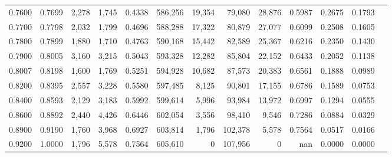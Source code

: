 \begin{tabular}{rrrrrrrrrrrrr}
0.7600 & 0.7699 &  2,278 & 1,745 &                                     0.4338 & 586,256 &  19,354 &  79,080 &  28,876 & 0.5987 & 0.2675 & 0.1793 \\
0.7700 & 0.7798 &  2,032 & 1,799 &                                     0.4696 & 588,288 &  17,322 &  80,879 &  27,077 & 0.6099 & 0.2508 & 0.1605 \\
0.7800 & 0.7899 &  1,880 & 1,710 &                                     0.4763 & 590,168 &  15,442 &  82,589 &  25,367 & 0.6216 & 0.2350 & 0.1430 \\
0.7900 & 0.8005 &  3,160 & 3,215 &                                     0.5043 & 593,328 &  12,282 &  85,804 &  22,152 & 0.6433 & 0.2052 & 0.1138 \\
0.8007 & 0.8198 &  1,600 & 1,769 &                                     0.5251 & 594,928 &  10,682 &  87,573 &  20,383 & 0.6561 & 0.1888 & 0.0989 \\
0.8200 & 0.8395 &  2,557 & 3,228 &                                     0.5580 & 597,485 &   8,125 &  90,801 &  17,155 & 0.6786 & 0.1589 & 0.0753 \\
0.8400 & 0.8593 &  2,129 & 3,183 &                                     0.5992 & 599,614 &   5,996 &  93,984 &  13,972 & 0.6997 & 0.1294 & 0.0555 \\
0.8600 & 0.8892 &  2,440 & 4,426 &                                     0.6446 & 602,054 &   3,556 &  98,410 &   9,546 & 0.7286 & 0.0884 & 0.0329 \\
0.8900 & 0.9190 &  1,760 & 3,968 &                                     0.6927 & 603,814 &   1,796 & 102,378 &   5,578 & 0.7564 & 0.0517 & 0.0166 \\
0.9200 & 1.0000 &  1,796 & 5,578 &                                     0.7564 & 605,610 &       0 & 107,956 &       0 &    nan & 0.0000 & 0.0000 \\
\bottomrule
\end{tabular}
